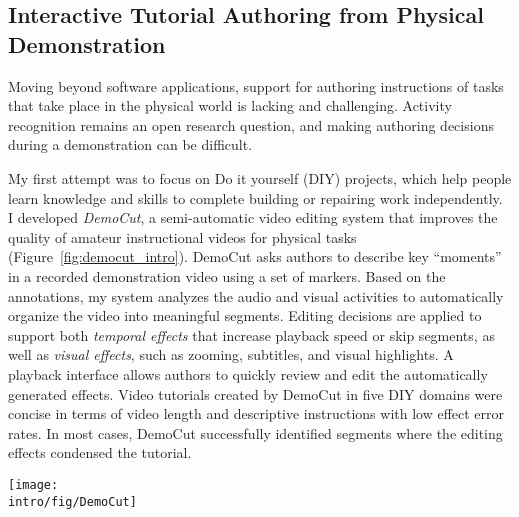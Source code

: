 \subsection{Interactive Tutorial Authoring from Physical Demonstration}


Moving beyond software applications, support for authoring instructions of tasks that take place in the physical world is lacking and challenging. Activity recognition remains an open research question, and making authoring decisions during a demonstration can be difficult.

My first attempt was to focus on Do it yourself (DIY) projects, which help people learn knowledge and skills to complete building or repairing work independently.
%
I developed \emph{DemoCut}, a semi-automatic video editing system that improves the quality of amateur instructional videos for physical tasks (Figure~\ref{fig:democut_intro}). DemoCut asks authors to describe key ``moments'' in a recorded demonstration video using a set of markers. Based on the annotations, my system analyzes the audio and visual activities to automatically organize the video into meaningful segments. Editing decisions are applied to support both \emph{temporal effects} that increase playback speed or skip segments, as well as \emph{visual effects}, such as zooming, subtitles, and visual highlights. A playback interface allows authors to quickly review and edit the automatically generated effects.
%
Video tutorials created by DemoCut in five DIY domains were concise in terms of video length and descriptive instructions with low effect error rates. In most cases, DemoCut successfully identified segments where the editing effects condensed the tutorial.


\begin{figure*}[t]
  \centering
  \texttt{[image: \\intro/fig/DemoCut]}
  \caption{DemoCut asks authors to mark key moments in a recorded video of demonstration using a set of marker types. Based on marker information, the system uses audio and video analysis to automatically organize the video into meaningful segments and apply appropriate video editing effects, which can be modified via a playback UI.}
  \label{fig:democut_intro}
\end{figure*}

